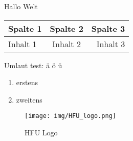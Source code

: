 \documentclass{article}
\begin{document}
	Hallo Welt  \newline
	
	\begin{tabular}[h]{l|c|r}
		Spalte 1 & Spalte 2 & Spalte 3 \\
		\hline
		Inhalt 1 & Inhalt 2 & Inhalt 3 \\
	\end{tabular}
	
	Umlaut test: \newline
	\"a \newline
	\"o	\newline
	\"u	\newline
	
	\begin{enumerate}
		\item erstens
		\item zweitens
	\end{enumerate}
	
	\begin{figure}[h]
	\begin{center}
	\texttt{[image: img/HFU\_logo.png]}
	\caption{HFU Logo}
	\end{center}
	\end{figure}
	
\end{document}
